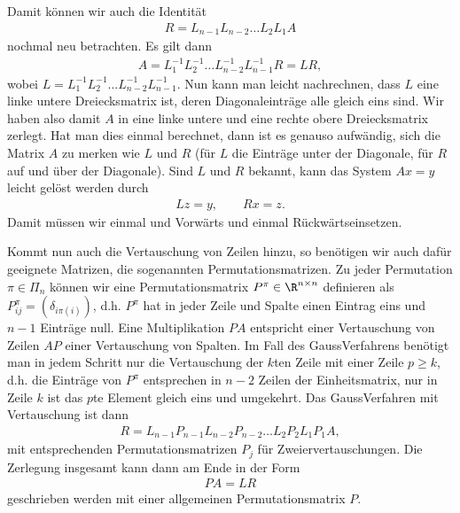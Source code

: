 \documentclass[letterpaper,10pt,english]{jupyterBook}
\begin{document}
Damit können wir auch die Identität
\begin{equation*}
\begin{split}  R  = L_{n-1} L_{n-2} \ldots L_2 L_1 A\end{split}
\end{equation*}
nochmal neu betrachten. Es gilt dann
\begin{equation*}
\begin{split} A =  L_1^{-1}   L_2^{-1} \ldots  L_{n-2}^{-1} L_{n-1}^{-1} R  = L R,\end{split}
\end{equation*}
wobei \(L= L_1^{-1}   L_2^{-1} \ldots  L_{n-2}^{-1} L_{n-1}^{-1}\). Nun kann man leicht nachrechnen, dass \(L\) eine linke untere Dreiecksmatrix ist, deren Diagonaleinträge alle gleich eins sind. Wir haben also damit \(A\) in eine linke untere und eine rechte obere Dreiecksmatrix zerlegt. Hat man dies einmal berechnet, dann ist es genauso aufwändig, sich die Matrix \(A\) zu merken wie \(L\) und \(R\) (für \(L\) die Einträge unter der Diagonale, für \(R\) auf und über der Diagonale). Sind \(L\) und \(R\) bekannt, kann das System \(Ax=y\) leicht gelöst werden durch
\begin{equation*}
\begin{split} L z = y, \qquad Rx = z.\end{split}
\end{equation*}
Damit müssen wir einmal und Vorwärts\sphinxhyphen{} und einmal Rückwärtseinsetzen.

Kommt nun auch die Vertauschung von Zeilen hinzu, so benötigen wir auch dafür geeignete Matrizen, die sogenannten Permutationsmatrizen. Zu jeder Permutation \(\pi \in \Pi_n\) können wir eine Permutationsmatrix \(P^\pi \in \R^{n \times n}\) definieren als \(P_{ij}^\pi = (\delta_{i\pi(i)})\), d.h. \(P^\pi\) hat in jeder Zeile und Spalte einen Eintrag eins und \(n-1\) Einträge null. Eine Multiplikation \(PA\) entspricht einer Vertauschung von Zeilen \(AP\) einer Vertauschung von Spalten. Im Fall des Gauss\sphinxhyphen{}Verfahrens benötigt man in jedem Schritt nur die Vertauschung der \(k\)\sphinxhyphen{}ten Zeile mit einer Zeile \(p \geq k\), d.h. die Einträge von \(P^\pi\) entsprechen in \(n-2\) Zeilen der Einheitsmatrix, nur in Zeile \(k\) ist das \(p\)\sphinxhyphen{}te Element gleich eins und umgekehrt. Das Gauss\sphinxhyphen{}Verfahren mit Vertauschung ist dann
\begin{equation*}
\begin{split} R=L_{n-1} P_{n-1} L_{n-2} P_{n-2}\ldots L_2 P_2 L_1 P_1 A ,\end{split}
\end{equation*}
mit entsprechenden Permutationsmatrizen \(P_j\) für Zweiervertauschungen. Die Zerlegung insgesamt kann dann am Ende in der Form
\begin{equation*}
\begin{split} P A = L R\end{split}
\end{equation*}
geschrieben werden mit einer allgemeinen Permutationsmatrix \(P\).
\end{document}
